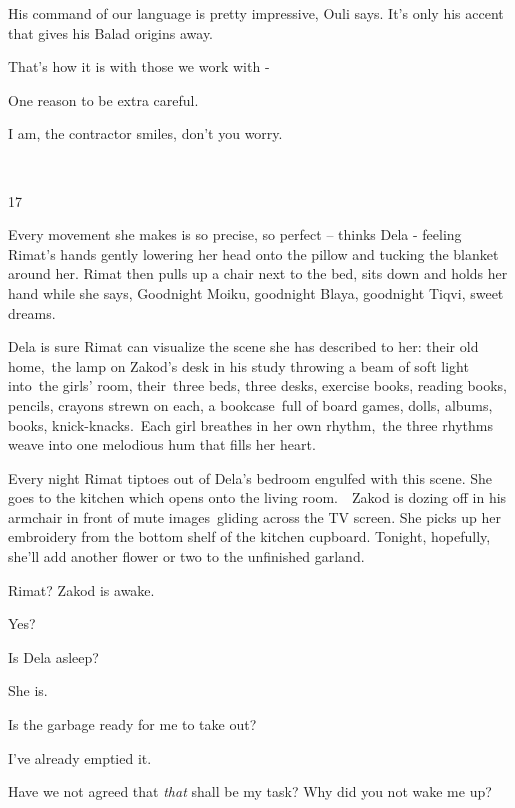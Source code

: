 \documentclass[twoside,11pt]{book}
\begin{document}
{\textquotedbl}His command of our language is pretty impressive,{\textquotedbl} Ouli says. {\textquotedbl}It's only his
accent that gives his Balad origins away.{\textquotedbl}

{\textquotedbl}That's how it is with those we work with -{\textquotedbl}\ 

{\textquotedbl}One reason to be extra careful.{\textquotedbl}

{\textquotedbl}I am,{\textquotedbl} the contractor smiles, {\textquotedbl}don't you worry.{\textquotedbl}

~

17

Every movement she makes is so precise, so perfect -- thinks Dela - feeling Rimat's hands gently lowering her head onto
the pillow and tucking the blanket around her. Rimat then pulls up a chair next to the bed, sits down and holds her
hand while she says, {\textquotedbl}Goodnight Moiku, goodnight Blaya, goodnight Tiqvi, sweet dreams.{\textquotedbl}\ 

Dela is sure Rimat can visualize the scene she has described to her: their old home,\ the lamp on Zakod's desk in his
study throwing a beam of soft light into\ the girls' room, their\ three beds, three desks, exercise books, reading
books, pencils, crayons strewn on each, a bookcase~full of board games, dolls, albums, books, knick-knacks.\ Each girl
breathes in her own rhythm,\ the three rhythms weave into one melodious hum that fills her heart.\ 

Every night Rimat tiptoes out of Dela's bedroom engulfed with this scene. She goes to the kitchen which opens onto the
living room.\ \ Zakod is dozing off in his armchair in front of mute images~gliding across the TV screen. She picks up
her embroidery from the bottom shelf of the kitchen cupboard. Tonight, hopefully, she'll add another flower or two to
the unfinished garland.

{\textquotedbl}Rimat?{\textquotedbl} Zakod is awake. 

{\textquotedbl}Yes?{\textquotedbl}

{\textquotedbl}Is Dela asleep?{\textquotedbl} 

{\textquotedbl}She is.{\textquotedbl} 

{\textquotedbl}Is the garbage ready for me to take out?{\textquotedbl} 

{\textquotedbl}I've already emptied it.{\textquotedbl} 

{\textquotedbl}Have we not agreed that \textit{that} shall be my task? Why did you not wake me up?{\textquotedbl} 
\end{document}
